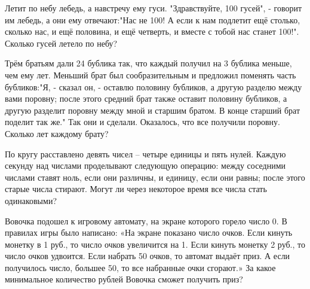 \newpage

 Летит по небу лебедь, а навстречу ему гуси. "Здравствуйте, 100 гусей", - говорит им лебедь, а они ему отвечают:"Нас не 100! А если к нам подлетит ещё столько, сколько нас, и ещё половина, и ещё четверть, и вместе с тобой нас станет 100!". Сколько гусей летело по небу?

 Трём братьям дали 24 бублика так, что каждый получил на 3 бублика меньше, чем ему лет. Меньший брат был сообразительным и предложил поменять часть бубликов:"Я, - сказал он, - оставлю половину бубликов, а другую разделю между вами поровну; после этого средний брат также оставит половину бубликов, а другую разделит поровну между мной и старшим братом. В конце старший брат поделит так же." Так они и сделали. Оказалось, что все получили поровну. Сколько лет каждому брату?

 По кругу расставлено девять чисел – четыре единицы и пять нулей. Каждую секунду над числами проделывают следующую операцию: между соседними числами ставят ноль, если они различны, и единицу, если они равны; после этого старые числа стирают. Могут ли через некоторое время все числа стать одинаковыми?

  Вовочка подошел к игровому автомату, на экране которого горело число 0. В правилах игры было написано: «На экране показано число очков. Если кинуть монетку в 1 руб., то число очков увеличится на 1. Если кинуть монетку 2 руб., то число очков удвоится. Если набрать 50 очков, то автомат выдаёт приз. А если получилось число, большее 50, то все набранные очки сгорают.» За какое минимальное количество рублей Вовочка сможет получить приз?